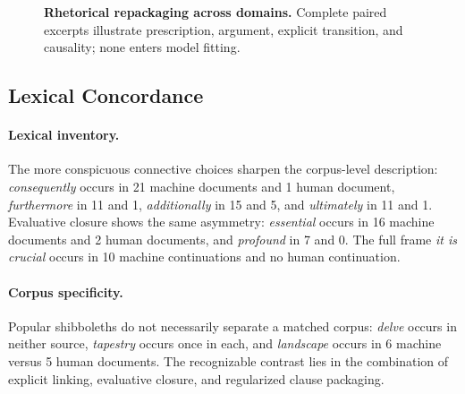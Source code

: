\begin{figure}[!t]
\begin{tcbraster}[raster columns=2,raster equal height=rows,raster column skip=6pt,raster row skip=5pt]
\begin{tcolorbox}[evidencecard,title={\textbf{D}\quad\textsc{Literary}\hfill\textit{Question \(\rightarrow\) causality}}]
\end{tcolorbox}
\end{tcbraster}
\caption{\textbf{Rhetorical repackaging across domains.} Complete paired excerpts illustrate prescription, argument, explicit transition, and causality; none enters model fitting.}
\label{fig:realization-examples}
\end{figure}

\subsection{Lexical Concordance}
\label{app:concordance}

\paragraph{Lexical inventory.} The more conspicuous connective choices sharpen the corpus-level description: \emph{consequently} occurs in 21 machine documents and 1 human document, \emph{furthermore} in 11 and 1, \emph{additionally} in 15 and 5, and \emph{ultimately} in 11 and 1. Evaluative closure shows the same asymmetry: \emph{essential} occurs in 16 machine documents and 2 human documents, and \emph{profound} in 7 and 0. The full frame \emph{it is crucial} occurs in 10 machine continuations and no human continuation.

\paragraph{Corpus specificity.} Popular shibboleths do not necessarily separate a matched corpus: \emph{delve} occurs in neither source, \emph{tapestry} occurs once in each, and \emph{landscape} occurs in 6 machine versus 5 human documents. The recognizable contrast lies in the combination of explicit linking, evaluative closure, and regularized clause packaging.
